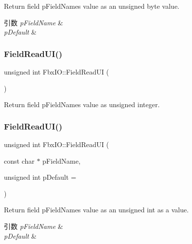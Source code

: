 Return field p\+Field\+Name\textquotesingle{}s value as an unsigned byte value. 
\begin{DoxyParams}{引数}
{\em p\+Field\+Name} & \\
\hline
{\em p\+Default} & \\
\hline
\end{DoxyParams}
\mbox{\label{class_fbx_i_o_a76e9dd8ba42fcae62abe6031db76182a}} 
\subsubsection{\texorpdfstring{Field\+Read\+U\+I()}{FieldReadUI()}\hspace{0.1cm}{\footnotesize\ttfamily [1/2]}}
{\footnotesize\ttfamily unsigned int Fbx\+I\+O\+::\+Field\+Read\+UI (\begin{DoxyParamCaption}{ }\end{DoxyParamCaption})}



Return field p\+Field\+Name\textquotesingle{}s value as unsigned integer. 

\mbox{\label{class_fbx_i_o_a4b6c7c0a179a1b0852449c37839e9fae}} 
\subsubsection{\texorpdfstring{Field\+Read\+U\+I()}{FieldReadUI()}\hspace{0.1cm}{\footnotesize\ttfamily [2/2]}}
{\footnotesize\ttfamily unsigned int Fbx\+I\+O\+::\+Field\+Read\+UI (\begin{DoxyParamCaption}\item[{const char $\ast$}]{p\+Field\+Name,  }\item[{unsigned int}]{p\+Default = {} }\end{DoxyParamCaption})}

Return field p\+Field\+Name\textquotesingle{}s value as an unsigned int as a value. 
\begin{DoxyParams}{引数}
{\em p\+Field\+Name} & \\
\hline
{\em p\+Default} & \\
\hline
\end{DoxyParams}
\mbox{\label{class_fbx_i_o_a364f2217f036c7465426c046b131ceb0}} 
